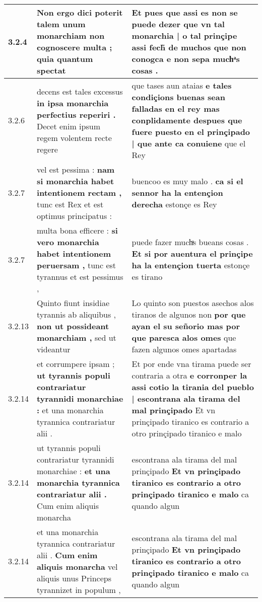 \begin{tabular}{|p{1cm}|p{6.5cm}|p{6.5cm}|}
3.2.4 & Non ergo dici poterit \textbf{ talem unum monarchiam non cognoscere multa ; } quia quantum spectat & Et pues que assi es non se puede dezer \textbf{ que vn tal monarchia | o tal prinçipe assi fech̃ de muchos que non conogca } e non sepa muchͣs cosas . \\\hline
3.2.6 & decens est tales excessus \textbf{ in ipsa monarchia perfectius reperiri . } Decet enim ipsum regem volentem recte regere & que tases aun ataias \textbf{ e tales condiçions buenas sean falladas en el rey mas conplidamente despues que fuere puesto en el prinçipado | que ante ca conuiene } que el Rey \\\hline
3.2.7 & vel est pessima : \textbf{ nam si monarchia habet intentionem rectam , } tunc est Rex et est optimus principatus : & buencoo es muy malo . \textbf{ ca si el sennor ha la entençion derecha } estonçe es Rey \\\hline
3.2.7 & multa bona efficere : \textbf{ si vero monarchia habet intentionem peruersam , } tunc est tyrannus et est pessimus , & puede fazer muchͣs bueans cosas . \textbf{ Et si por auentura el prinçipe ha la entençion tuerta } estonçe es tirano \\\hline
3.2.13 & Quinto fiunt insidiae tyrannis ab aliquibus , \textbf{ non ut possideant monarchiam , } sed ut videantur & Lo quinto son puestos asechos alos tiranos de algunos non \textbf{ por que ayan el su señorio mas por que paresca alos omes } que fazen algunos omes apartadas \\\hline
3.2.14 & et corrumpere ipsam ; \textbf{ ut tyrannis populi contrariatur tyrannidi monarchiae : } et una monarchia tyrannica contrariatur alii . & Et por ende vna tirama puede ser contraria a otra \textbf{ e corronper la assi cotio la tirania del pueblo | escontrana ala tirama del mal prinçipado } Et vn prinçipado tiranico es contrario a otro prinçipado tiranico e malo \\\hline
3.2.14 & ut tyrannis populi contrariatur tyrannidi monarchiae : \textbf{ et una monarchia tyrannica contrariatur alii . } Cum enim aliquis monarcha & escontrana ala tirama del mal prinçipado \textbf{ Et vn prinçipado tiranico es contrario a otro prinçipado tiranico e malo } ca quando algun \\\hline
3.2.14 & et una monarchia tyrannica contrariatur alii . \textbf{ Cum enim aliquis monarcha } vel aliquis unus Princeps tyrannizet in populum , & escontrana ala tirama del mal prinçipado \textbf{ Et vn prinçipado tiranico es contrario a otro prinçipado tiranico e malo } ca quando algun \\\hline

\end{tabular}
